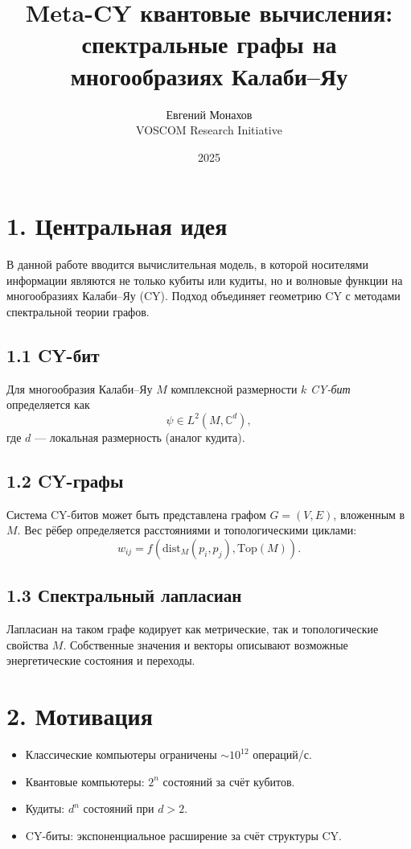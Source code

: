 \documentclass[12pt,a4paper]{article}
\title{Meta-CY квантовые вычисления: спектральные графы на многообразиях Калаби--Яу}
\author{Евгений Монахов \\ VOSCOM Research Initiative}
\date{2025}
\begin{document}
\maketitle

\section*{1. Центральная идея}
В данной работе вводится вычислительная модель, в которой 
носителями информации являются не только кубиты или кудиты, 
но и волновые функции на многообразиях Калаби--Яу (CY).  
Подход объединяет геометрию CY с методами спектральной теории графов.  

\subsection*{1.1 CY-бит}
Для многообразия Калаби--Яу $M$ комплексной размерности $k$ 
\emph{CY-бит} определяется как
\begin{equation}
\psi \in L^2(M, \mathbb{C}^d),
\end{equation}
где $d$ — локальная размерность (аналог кудита).  

\subsection*{1.2 CY-графы}
Система CY-битов может быть представлена графом $G=(V,E)$, 
вложенным в $M$.  
Вес рёбер определяется расстояниями и топологическими циклами:
\begin{equation}
w_{ij} = f(\mathrm{dist}_M(p_i,p_j), \mathrm{Top}(M)).
\end{equation}

\subsection*{1.3 Спектральный лапласиан}
Лапласиан на таком графе кодирует 
как метрические, так и топологические свойства $M$.  
Собственные значения и векторы описывают 
возможные энергетические состояния и переходы.  

\section*{2. Мотивация}
\begin{itemize}
  \item Классические компьютеры ограничены $\sim 10^{12}$ операций/с.
  \item Квантовые компьютеры: $2^n$ состояний за счёт кубитов.
  \item Кудиты: $d^n$ состояний при $d>2$.
  \item CY-биты: экспоненциальное расширение за счёт структуры CY.
\end{itemize}
\end{document}
